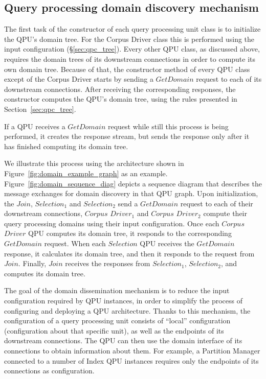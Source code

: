 \subsection{Query processing domain discovery mechanism}

The first task of the constructor of each query processing unit class is to initialize the QPU's domain tree.
For the Corpus Driver class this is performed using the input configuration (\S\ref{sec:qpc_tree}).
Every other QPU class, as discussed above, requires the domain trees of its downstream connections in order to compute its own domain tree.
Because of that, the constructor method of every QPU class except of the Corpus Driver starts by sending a $GetDomain$ request to each
of its downstream connections.
After receiving the corresponding responses, the constructor computes the QPU's domain tree, using the rules presented in Section~\ref{sec:qpc_tree}.

If a QPU receives a $GetDomain$ request while still this process is being performed, it creates the response stream,
but sends the response only after it has finished computing its domain tree.

We illustrate this process using the architecture shown in Figure~\ref{fig:domain_example_graph} as an example.
Figure~\ref{fig:domain_sequence_diag} depicts a sequence diagram that describes the message exchanges for domain discovery
in that QPU graph.
Upon initialization, the $Join$, $Selection_1$ and $Selection_2$ send a $GetDomain$ request to each of their downstream
connections,
$Corpus$ $Driver_1$ and $Corpus$ $Driver_2$ compute their query processing domains using their input configuration.
Once each $Corpus$ $Driver$ QPU computes its domain tree, it responds to the corresponding $GetDomain$ request.
When each $Selection$ QPU receives the $GetDomain$ response, it calculates its domain tree, and then it responds to the request from $Join$.
Finally, $Join$ receives the responses from $Selection_1$, $Selection_2$, and computes its domain tree.

The goal of the domain dissemination mechanism is to reduce the input configuration required by QPU instances,
in order to simplify the process of configuring and deploying a QPU architecture.
Thanks to this mechanism, the configuration of a query processing unit consists of ``local'' configuration
(configuration about that specific unit), as well as the endpoints of its downstream connections.
The QPU can then use the domain interface of its connections to obtain information about them.
For example, a Partition Manager connected to a number of Index QPU instances requires only the endpoints of its
connections as configuration.

